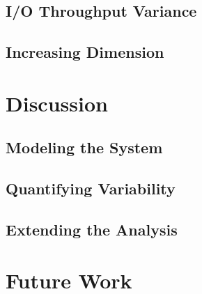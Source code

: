 \documentclass{scspaperproc}
\theoremstyle{scsthe}
\begin{document}
\subsection{I/O Throughput Variance}
\subsection{Increasing Dimension}


\section{Discussion}
\subsection{Modeling the System}
\subsection{Quantifying Variability}
\subsection{Extending the Analysis}

\section{Future Work}




\end{document}
